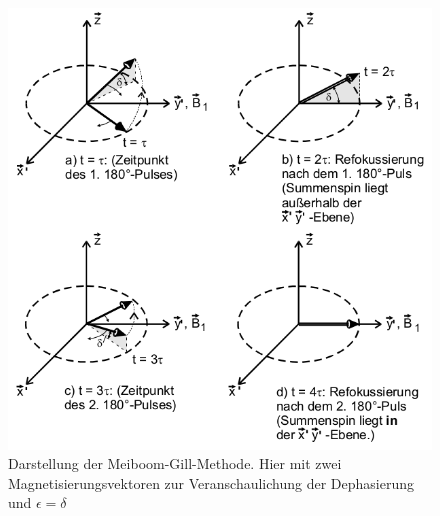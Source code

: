 \begin{figure}[t]
 \includegraphics[width=.7\textwidth]{../pics/MG.png}
 \caption{Darstellung der Meiboom-Gill-Methode. Hier mit zwei Magnetisierungsvektoren zur Veranschaulichung der Dephasierung und $\epsilon=\delta$
 \cite{Anl}}
 \label{pic:MGmeth}
\end{figure}

